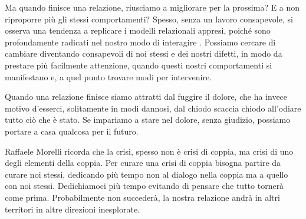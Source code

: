 \documentclass[12pt]{book} %
\begin{document}
Ma quando finisce una relazione, riusciamo a migliorare per la prossima? E a non riproporre più gli stessi comportamenti? Spesso, senza un lavoro consapevole, si osserva una tendenza a replicare i modelli relazionali appresi, poiché sono profondamente radicati nel nostro modo di interagire
. Possiamo cercare di cambiare diventando consapevoli di noi stessi e dei nostri difetti, in modo da prestare più facilmente attenzione,
quando questi nostri comportamenti si manifestano e, a quel punto trovare modi per intervenire. 

Quando una relazione finisce siamo attratti dal fuggire il dolore, che ha invece motivo d'esserci,
solitamente in modi dannosi, dal chiodo scaccia chiodo all'odiare tutto ciò che è stato. Se
impariamo a stare nel dolore, senza giudizio, possiamo portare a casa qualcosa per il futuro.

Raffaele Morelli ricorda che la crisi, spesso non è crisi di coppia, ma crisi di uno degli elementi della coppia. Per curare
una crisi di coppia bisogna partire da curare noi stessi, dedicando più tempo non al dialogo nella coppia ma a quello
con noi stessi. Dedichiamoci più tempo evitando di pensare che tutto tornerà come prima. Probabilmente non succederà, la nostra relazione andrà in altri territori in altre direzioni inesplorate.
\end{document}
